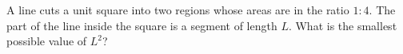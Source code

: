 A line cuts a unit square into two regions whose areas are in the ratio $1:4$. The part of the line inside the square is a segment of length $L$. What is the smallest possible value of $L^2$?
